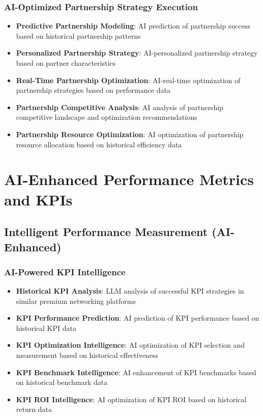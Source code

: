 \subsubsection{AI-Optimized Partnership Strategy Execution}

\begin{itemize}
    \item \textbf{Predictive Partnership Modeling}: AI prediction of partnership success based on historical partnership patterns
    \item \textbf{Personalized Partnership Strategy}: AI-personalized partnership strategy based on partner characteristics
    \item \textbf{Real-Time Partnership Optimization}: AI-real-time optimization of partnership strategies based on performance data
    \item \textbf{Partnership Competitive Analysis}: AI analysis of partnership competitive landscape and optimization recommendations
    \item \textbf{Partnership Resource Optimization}: AI optimization of partnership resource allocation based on historical efficiency data
\end{itemize}

\section{AI-Enhanced Performance Metrics and KPIs}

\subsection{Intelligent Performance Measurement (AI-Enhanced)}

\subsubsection{AI-Powered KPI Intelligence}

\begin{itemize}
    \item \textbf{Historical KPI Analysis}: LLM analysis of successful KPI strategies in similar premium networking platforms
    \item \textbf{KPI Performance Prediction}: AI prediction of KPI performance based on historical KPI data
    \item \textbf{KPI Optimization Intelligence}: AI optimization of KPI selection and measurement based on historical effectiveness
    \item \textbf{KPI Benchmark Intelligence}: AI enhancement of KPI benchmarks based on historical benchmark data
    \item \textbf{KPI ROI Intelligence}: AI optimization of KPI ROI based on historical return data
\end{itemize}

